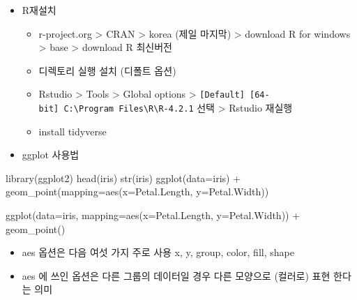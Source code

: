 \documentclass[
]{book}
\newenvironment{Shaded}{\begin{snugshade}}{\end{snugshade}}
\newcommand{\AttributeTok}[1]{\textcolor[rgb]{0.77,0.63,0.00}{#1}}
\newcommand{\FunctionTok}[1]{\textcolor[rgb]{0.00,0.00,0.00}{#1}}
\newcommand{\NormalTok}[1]{#1}
\newcommand{\SpecialCharTok}[1]{\textcolor[rgb]{0.00,0.00,0.00}{#1}}
\providecommand{\tightlist}{%
  \setlength{\itemsep}{0pt}\setlength{\parskip}{0pt}}
\begin{document}
\begin{itemize}
\tightlist
\item
  R재설치

  \begin{itemize}
  \tightlist
  \item
    r-project.org \textgreater{} CRAN \textgreater{} korea (제일 마지막) \textgreater{} download R for windows \textgreater{} base \textgreater{} download R 최신버전
  \item
    디렉토리 실행 설치 (디폴트 옵션)
  \item
    Rstudio \textgreater{} Tools \textgreater{} Global options \textgreater{} \texttt{{[}Default{]}\ {[}64-bit{]}\ C:\textbackslash{}Program\ Files\textbackslash{}R\textbackslash{}R-4.2.1} 선택 \textgreater{} Rstudio 재실행
  \item
    install tidyverse
  \end{itemize}
\item
  ggplot 사용법
\end{itemize}

\begin{Shaded}
\begin{Highlighting}[]
\FunctionTok{library}\NormalTok{(ggplot2)}
\FunctionTok{head}\NormalTok{(iris)}
\FunctionTok{str}\NormalTok{(iris)}
\FunctionTok{ggplot}\NormalTok{(}\AttributeTok{data=}\NormalTok{iris) }\SpecialCharTok{+} 
  \FunctionTok{geom\_point}\NormalTok{(}\AttributeTok{mapping=}\FunctionTok{aes}\NormalTok{(}\AttributeTok{x=}\NormalTok{Petal.Length, }\AttributeTok{y=}\NormalTok{Petal.Width))}
\end{Highlighting}
\end{Shaded}

\begin{Shaded}
\begin{Highlighting}[]
\FunctionTok{ggplot}\NormalTok{(}\AttributeTok{data=}\NormalTok{iris, }\AttributeTok{mapping=}\FunctionTok{aes}\NormalTok{(}\AttributeTok{x=}\NormalTok{Petal.Length, }\AttributeTok{y=}\NormalTok{Petal.Width)) }\SpecialCharTok{+}
  \FunctionTok{geom\_point}\NormalTok{()}
\end{Highlighting}
\end{Shaded}

\begin{itemize}
\tightlist
\item
  aes 옵션은 다음 여섯 가지 주로 사용 x, y, group, color, fill, shape
\item
  aes 에 쓰인 옵션은 다른 그룹의 데이터일 경우 다른 모양으로 (컬러로) 표현 한다는 의미
\end{itemize}
\end{document}
